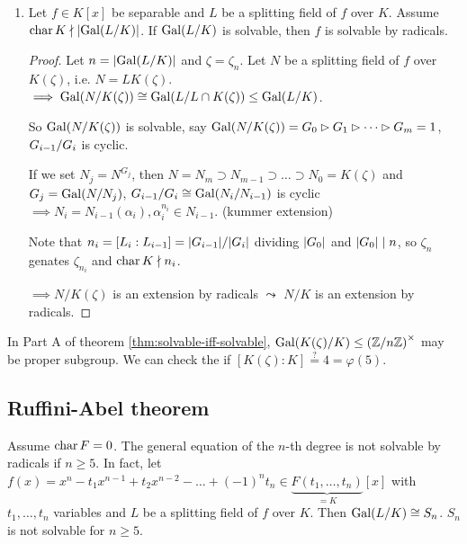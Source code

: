 \begin{theorem}
\begin{enumerate}[label={\bf Part \Alph*:}]
  \item Let $f \in K[x]$ be separable and $L$ be a splitting field of $f$ over $K$.
  Assume $\operatorname{char} K \nmid \lvert\operatorname{Gal}(L/K)\rvert$. If $\operatorname{Gal}(L/K)$ is solvable, then
  $f$ is solvable by radicals.

  \begin{proof}
    Let $n = \lvert\operatorname{Gal}(L/K)\rvert$ and $\zeta = \zeta_n$.
    Let $N$ be a splitting field of $f$ over $K(\zeta)$, i.e. $N = LK(\zeta)$.
    $\implies \operatorname{Gal}(N/K(\zeta)) \cong \operatorname{Gal}(L/L\cap K(\zeta)) \le \operatorname{Gal}(L/K)$.

    So $\operatorname{Gal}(N/K(\zeta))$ is solvable, say $\operatorname{Gal}(N/K(\zeta)) = G_0 \rhd G_1
    \rhd \dots \rhd G_m = 1$, ${G_{i-1}}/{G_i}$ is cyclic.
    
    If we set $N_j = N^{G_j}$, then
    $N = N_m \supset N_{m-1} \supset \dots \supset N_0 = K(\zeta)$ and
    $G_j = \operatorname{Gal}(N/N_j)$, ${G_{i-1}}/{G_i} \cong \operatorname{Gal}(N_i/N_{i-1})$ is
    cyclic $\implies N_i = N_{i-1}(\alpha_i), \alpha_i^{n_i} \in N_{i-1}$.
    (kummer extension)
    \begin{mdframed}
      Note that $n_i = [L_i : L_{i-1}] = \lvert G_{i-1}\rvert / \lvert G_i\rvert$ dividing
      $\lvert G_0\rvert$ and $\lvert G_0\rvert \mid n$, so $\zeta_n$ genates $\zeta_{n_i}$
      and $\operatorname{char} K \nmid n_i$.
    \end{mdframed}
    $\implies N/K(\zeta)$ is an extension by radicals $\leadsto$
    $N/K$ is an extension by radicals.
  \end{proof}
\end{enumerate}
\end{theorem}

\begin{remark}
  In Part A of theorem \ref{thm:solvable-iff-solvable},
  $\operatorname{Gal}(K(\zeta)/K) \le \left({\mathbb{Z}}/{n\mathbb{Z}}\right)^\times$ may be proper
  subgroup. We can check the if $[K(\zeta) : K] \overset{?}{=} 4 = \varphi(5)$.
\end{remark}

\subsection{Ruffini-Abel theorem}

\begin{theorem}
  Assume $\operatorname{char} F = 0$.
  The general equation of the $n$-th degree is not solvable by radicals if
  $n \ge 5$. In fact, let $f(x) = x^n - t_1x^{n-1} + t_2 x^{n-2} - \dots +
  (-1)^nt_n \in \underbrace{F(t_1, \dots, t_n)}_{=K}[x]$ with
  $t_1, \dots, t_n$ variables and $L$ be a splitting field of $f$ over $K$.
  Then $\operatorname{Gal}(L/K) \cong S_n$. $S_n$ is not solvable for $n \ge 5$.
\end{theorem}

